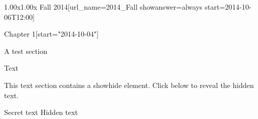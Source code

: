 \documentclass[12pt]{article}
\begin{document}
\begin{edXcourse}{1.00x}{1.00x Fall 2014}[url_name=2014_Fall showanswer=always start=2014-10-06T12:00]

\begin{edXchapter}{Chapter 1}[start="2014-10-04"]

\begin{edXsequential}{A test section}

\begin{edXtext}{Text}

This text section contains a showhide element.  Click below to reveal the hidden text.

\begin{edXshowhide}{Secret text}
Hidden text
\end{edXshowhide}

\end{edXtext}

\end{edXsequential}

\end{edXchapter}

\end{edXcourse}
\end{document}
